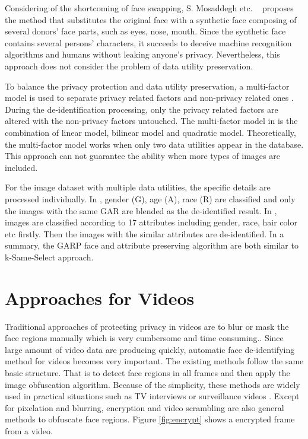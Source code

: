 	Considering of the shortcoming of face swapping, S. Mosaddegh etc. ~\cite{Mosa14}
	proposes the method that substitutes the original face with a synthetic face 
	composing of several donors' face parts, such as eyes, nose, mouth. Since the 
	synthetic face contains several persons' characters, it succeeds to deceive 
	machine recognition algorithms and humans without leaking anyone's privacy.
	Nevertheless, this approach does not consider the problem of data utility 
	preservation.

	To balance the privacy protection and data utility preservation, a multi-factor 
	model is used to separate privacy related factors and non-privacy related ones 
	\cite{multifactor08}. During the de-identification processing, only the privacy related 
	factors are altered with the non-privacy factors untouched. The multi-factor 
	model in \cite{multifactor08} is the combination of linear model, bilinear model 
	and quadratic model. Theoretically, the multi-factor model works when only two data 
	utilities appear in the database. This approach can not guarantee the ability when 
	more types of images are included.

	For the image dataset with multiple data utilities, the specific details are
	processed individually. In \cite{GARP14}, gender (G), age (A), race (R) are
	classified and only the images with the same GAR are blended as the de-identified
	result. In \cite{Attribute15}, images are classified according to 17 attributes 
	including gender, race, hair color etc firstly. Then the images with the similar
	attributes are de-identified. In a summary, the GARP face and attribute preserving
	algorithm are both similar to k-Same-Select approach.      

\section{Approaches for Videos}
\label{sec:APPvideos}

	Traditional approaches of protecting privacy in videos are to blur or mask the face regions manually which is very 
	cumbersome and time consuming..
	Since large amount of video data are producing quickly, automatic face de-identifying method for videos becomes very important.
	The existing methods follow the same basic structure. That is to detect face regions in
	all frames and then apply the image obfuscation algorithm. Because of the simplicity, these methods 
  	are widely used in practical situations such as TV interviews or surveillance videos \cite{Agrawal09}. Except
  	for pixelation and blurring, encryption and video scrambling are also general methods to obfuscate
  	face regions\cite{TrustCam10,dufaux10,scram11}. Figure \ref{fig:encrypt} shows a encrypted frame from a video.


